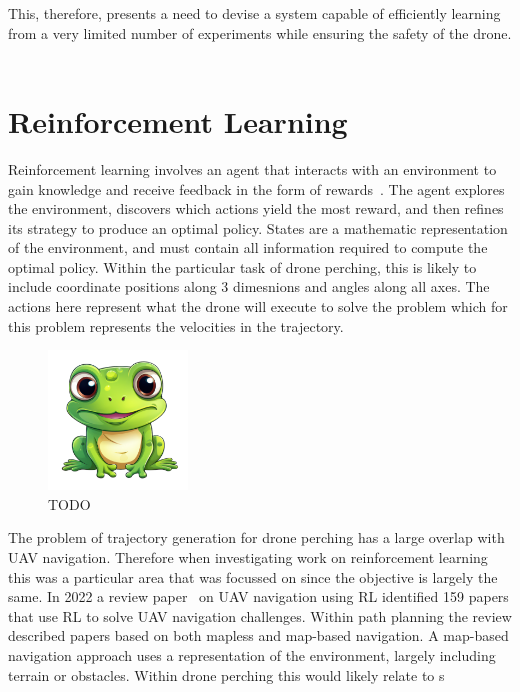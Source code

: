 This, therefore, presents a need to devise a system capable of efficiently learning from a very limited number of experiments while ensuring the safety of the drone. \\\\

\section{Reinforcement Learning}
Reinforcement learning involves an agent that interacts with an environment to gain knowledge and receive feedback in the form of rewards~\cite{rlIntroSuttonBarlo}.
The agent explores the environment, discovers which actions yield the most reward, and then refines its strategy to produce an optimal policy.
States are a mathematic representation of the environment, and must contain all information required to compute the optimal policy.
Within the particular task of drone perching, this is likely to include coordinate positions along 3 dimesnions and angles along all axes.
The actions here represent what the drone will execute to solve the problem which for this problem represents the velocities in the trajectory.

\begin{figure}[htbp]
  \centering
  \includegraphics[width=0.33\textwidth]{frog.png}
  \caption{TODO}
\label{fig:rl-intro-drone}
\end{figure}

The problem of trajectory generation for drone perching has a large overlap with UAV navigation.
Therefore when investigating work on reinforcement learning this was a particular area that was focussed on since the objective is largely the same.
In 2022 a review paper~\cite{aerialNavReview} on UAV navigation using RL identified 159 papers that use RL to solve UAV navigation challenges.
Within path planning the review described papers based on both mapless and map-based navigation.
A map-based navigation approach uses a representation of the environment, largely including terrain or obstacles.
Within drone perching this would likely relate to s 

